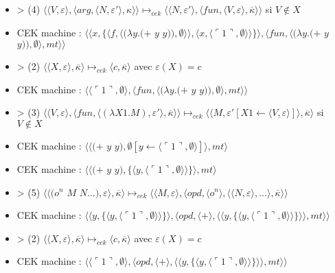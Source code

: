 \documentclass[10pt,a4paper]{report}
\begin{document}
\begin{itemize}
\item[] > (4) $\langle \langle V,\varepsilon\rangle,\langle arg,\langle N,\varepsilon'\rangle,\kappa\rangle\rangle \longmapsto_{cek} \langle \langle N,\varepsilon'\rangle,\langle fun,\langle V,\varepsilon\rangle,\overline{\kappa}\rangle\rangle$ si $V \notin X$
\item[] CEK machine : $\langle\langle x,\{\langle f,\langle(\lambda y.(+$ $y$ $y)),\emptyset\rangle\rangle,\langle x,\langle\ulcorner 1\urcorner,\emptyset\rangle\rangle\}\rangle,\langle fun,\langle(\lambda y.(+$ $y$ $y)),\emptyset\rangle,mt\rangle\rangle$	
\item[] > (2) $\langle\langle X,\varepsilon\rangle,\overline{\kappa}\rangle \longmapsto_{cek} \langle c,\overline{\kappa}\rangle$ avec $\varepsilon(X) = c$
\item[] CEK machine : $\langle \langle\ulcorner 1\urcorner,\emptyset\rangle,\langle fun,\langle(\lambda y.(+$ $y$ $y)),\emptyset\rangle,mt\rangle\rangle$	
\item[] > (3) $\langle\langle V,\varepsilon\rangle,\langle fun,\langle (\lambda X1.M),\varepsilon'\rangle,\overline{\kappa} \rangle \rangle \longmapsto_{cek} \langle \langle M,\varepsilon'[X1 \leftarrow \langle V,\varepsilon\rangle]\rangle,\overline{\kappa}\rangle$ si $V \notin X$
\item[] CEK machine : $\langle\langle(+$ $y$ $y),\emptyset[y \leftarrow\langle\ulcorner 1\urcorner,\emptyset\rangle]\rangle ,mt\rangle$
\item[] CEK machine : $\langle\langle(+$ $y$ $y),\{\langle y,\langle\ulcorner 1\urcorner,\emptyset\rangle\rangle\}\rangle ,mt\rangle$
\item[] > (5) $\langle\langle(o^{n}$ $M$ $N...),\varepsilon\rangle,\overline{\kappa}\rangle \longmapsto_{cek} \langle \langle M,\varepsilon\rangle,\langle opd,\langle o^{n}\rangle,\langle \langle N,\varepsilon\rangle,...\rangle,\overline{\kappa}\rangle\rangle$
\item[] CEK machine : $\langle\langle y,\{\langle y,\langle\ulcorner 1\urcorner,\emptyset\rangle\rangle\}\rangle ,\langle opd,\langle+\rangle,\langle\langle y,\{\langle y,\langle\ulcorner 1\urcorner,\emptyset\rangle\rangle\}\rangle\rangle,mt\rangle\rangle$
\item[] > (2) $\langle\langle X,\varepsilon\rangle,\overline{\kappa}\rangle \longmapsto_{cek} \langle c,\overline{\kappa}\rangle$ avec $\varepsilon(X) = c$
\item[] CEK machine : $\langle\langle\ulcorner 1\urcorner,\emptyset\rangle,\langle opd,\langle+\rangle,\langle\langle y,\{\langle y,\langle\ulcorner 1\urcorner,\emptyset\rangle\rangle\}\rangle\rangle,mt\rangle\rangle$

\end{itemize}
\end{document}

